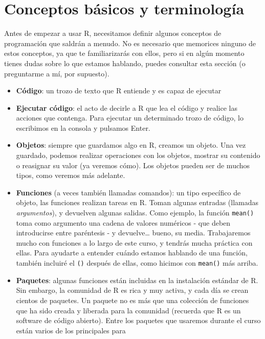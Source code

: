 \documentclass[
  letterpaper,
  DIV=11,
  numbers=noendperiod]{scrreprt}
\begin{document}
\hypertarget{conceptos-buxe1sicos-y-terminologuxeda}{%
\section{Conceptos básicos y
terminología}\label{conceptos-buxe1sicos-y-terminologuxeda}}

Antes de empezar a usar R, necesitamos definir algunos conceptos de
programación que saldrán a menudo. No es necesario que memorices ninguno
de estos conceptos, ya que te familiarizarás con ellos, pero si en algún
momento tienes dudas sobre lo que estamos hablando, puedes consultar
esta sección (o preguntarme a mí, por supuesto).

\begin{itemize}
\item
  \textbf{Código}: un trozo de texto que R entiende y es capaz de
  ejecutar
\item
  \textbf{Ejecutar código}: el acto de decirle a R que lea el código y
  realice las acciones que contenga. Para ejecutar un determinado trozo
  de código, lo escribimos en la consola y pulsamos Enter.
\item
  \textbf{Objetos}: siempre que guardamos algo en R, creamos un objeto.
  Una vez guardado, podemos realizar operaciones con los objetos,
  mostrar su contenido o reasignar su valor (ya veremos cómo). Los
  objetos pueden ser de muchos tipos, como veremos más adelante.
\item
  \textbf{Funciones} (a veces también llamadas comandos): un tipo
  específico de objeto, las funciones realizan tareas en R. Toman
  algunas entradas (llamadas \emph{argumentos}), y devuelven algunas
  salidas. Como ejemplo, la función \texttt{mean()} toma como argumento
  una cadena de valores numéricos - que deben introducirse entre
  paréntesis - y devuelve\ldots{} bueno, su media. Trabajaremos mucho
  con funciones a lo largo de este curso, y tendrás mucha práctica con
  ellas. Para ayudarte a entender cuándo estamos hablando de una
  función, también incluiré el \texttt{()} después de ellas, como
  hicimos con \texttt{mean()} más arriba.
\item
  \textbf{Paquetes}: algunas funciones están incluidas en la instalación
  estándar de R. Sin embargo, la comunidad de R es rica y muy activa, y
  cada día se crean cientos de paquetes. Un paquete no es más que una
  colección de funciones que ha sido creada y liberada para la comunidad
  (recuerda que R es un software de código abierto). Entre los paquetes
  que usaremos durante el curso están varios de los principales para

\end{itemize}
\end{document}
